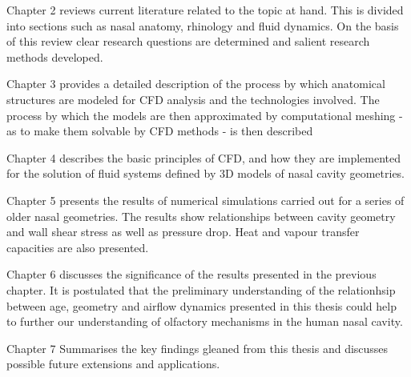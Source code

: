 \begin{description}
  \item{Chapter 2} reviews current literature related to the topic at hand. This is divided into sections such as nasal anatomy, rhinology and fluid dynamics. On the basis of this review clear research questions are determined and salient research methods developed.

  \item{Chapter 3} provides a detailed description of the process by which anatomical structures are modeled for CFD analysis and the technologies involved. The process by which the models are then approximated by computational meshing - as to make them solvable by CFD methods - is then described

  \item{Chapter 4} describes the basic principles of CFD, and how they are implemented for the solution of fluid systems defined by 3D models of nasal cavity geometries.

  \item{Chapter 5} presents the results of numerical simulations carried out for a series of older nasal geometries. The results show relationships between cavity geometry and wall shear stress as well as pressure drop. Heat and vapour transfer capacities are also presented.

  \item{Chapter 6} discusses the significance of the results presented in the previous chapter. It is postulated that the preliminary understanding of the relationhsip between age, geometry and airflow dynamics presented in this thesis could help to further our understanding of  olfactory mechanisms in the human nasal cavity.

  \item{Chapter 7} Summarises the key findings gleaned from this thesis and discusses possible future extensions and applications.

\end{description}
